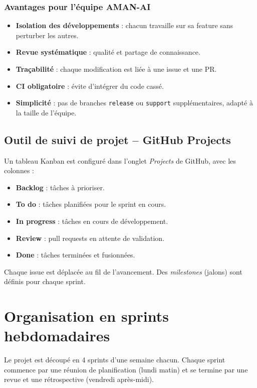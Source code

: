 \documentclass[11pt,a4paper]{article}
\begin{document}
\subsubsection{Avantages pour l’équipe AMAN-AI}
\begin{itemize}
    \item \textbf{Isolation des développements} : chacun travaille sur sa feature sans perturber les autres.
    \item \textbf{Revue systématique} : qualité et partage de connaissance.
    \item \textbf{Traçabilité} : chaque modification est liée à une issue et une PR.
    \item \textbf{CI obligatoire} : évite d’intégrer du code cassé.
    \item \textbf{Simplicité} : pas de branches \texttt{release} ou \texttt{support} supplémentaires, adapté à la taille de l’équipe.
\end{itemize}

\subsection{Outil de suivi de projet – GitHub Projects}
Un tableau Kanban est configuré dans l’onglet \textit{Projects} de GitHub, avec les colonnes :
\begin{itemize}
    \item \textbf{Backlog} : tâches à prioriser.
    \item \textbf{To do} : tâches planifiées pour le sprint en cours.
    \item \textbf{In progress} : tâches en cours de développement.
    \item \textbf{Review} : pull requests en attente de validation.
    \item \textbf{Done} : tâches terminées et fusionnées.
\end{itemize}
Chaque issue est déplacée au fil de l’avancement. Des \textit{milestones} (jalons) sont définis pour chaque sprint.

\section{Organisation en sprints hebdomadaires}
Le projet est découpé en 4 sprints d’une semaine chacun. Chaque sprint commence par une réunion de planification (lundi matin) et se termine par une revue et une rétrospective (vendredi après-midi).
\end{document}
